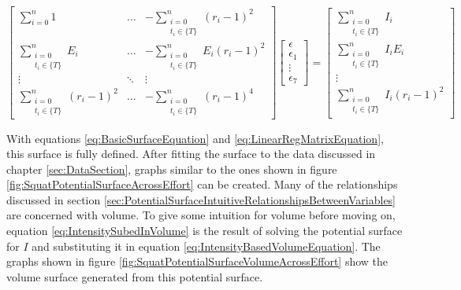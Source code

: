 \begin{equation}
    \label{eq:LinearRegMatrixEquation}
	\left[
    \begin{matrix}
        \sum_{i=0}^n 1 &
        \dots &
        -\sum_{\substack{i=0\\ t_i\in \{ T \}}}^n (r_i-1)^2 \\

        \sum_{\substack{i=0\\ t_i\in \{ T \}}}^n  E_i &
        \dots &
        -\sum_{\substack{i=0\\ t_i\in \{ T \}}}^n E_i (r_i-1)^2\\

        \vdots &
        \ddots &
        \vdots \\
        
        \sum_{\substack{i=0\\ t_i\in \{ T \}}}^n (r_i-1)^2 &
        \dots &
        -\sum_{\substack{i=0\\ t_i\in \{ T \}}}^n (r_i-1)^4
    \end{matrix}
    \right]
	\left[
    \begin{matrix}
        \epsilon \\ \epsilon_1 \\ \vdots \\ \epsilon_7
    \end{matrix}
    \right]
    =
	\left[
    \begin{matrix}
        \sum_{\substack{i=0\\ t_i\in \{ T \}}}^n I_i \\
        \sum_{\substack{i=0\\ t_i\in \{ T \}}}^n I_i E_i \\
        \vdots \\
        \sum_{\substack{i=0\\ t_i\in \{ T \}}}^n I_i(r_i-1)^2 
    \end{matrix}
    \right]
\end{equation}

With equations \ref{eq:BasicSurfaceEquation} and \ref{eq:LinearRegMatrixEquation}, this surface is fully defined. After fitting the surface to the data discussed in chapter \ref{sec:DataSection}, graphs similar to the ones shown in figure \ref{fig:SquatPotentialSurfaceAcrossEffort} can be created. Many of the relationships discussed in section \ref{sec:PotentialSurfaceIntuitiveRelationshipsBetweenVariables} are concerned with volume. To give some intuition for volume before moving on, equation \ref{eq:IntensitySubedInVolume} is the result of solving the potential surface for $I$ and substituting it in equation \ref{eq:IntensityBasedVolumeEquation}. The graphs shown in figure \ref{fig:SquatPotentialSurfaceVolumeAcrossEffort} show the volume surface generated from this potential surface.

